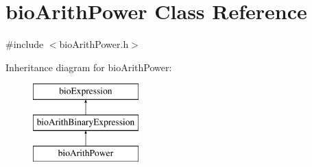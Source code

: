 \hypertarget{classbio_arith_power}{}\section{bio\+Arith\+Power Class Reference}
\label{classbio_arith_power}


{\ttfamily \#include $<$bio\+Arith\+Power.\+h$>$}

Inheritance diagram for bio\+Arith\+Power\+:\begin{figure}[H]
\begin{center}
\leavevmode
\includegraphics[height=3.000000cm]{classbio_arith_power}
\end{center}
\end{figure}
